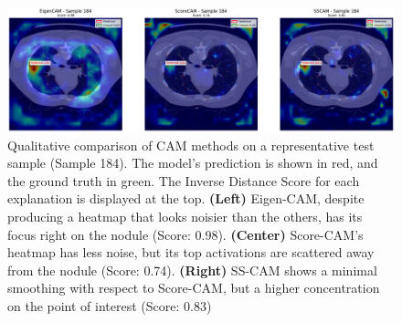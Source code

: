 \begin{figure}[h]
    \centering
    \includegraphics[width=1\linewidth]{images/xai-sample-184.png}
    \caption{Qualitative comparison of CAM methods on a representative test sample (Sample 184). The model's prediction is shown in red, and the ground truth in green. The Inverse Distance Score for each explanation is displayed at the top. \textbf{(Left)} Eigen-CAM, despite producing a heatmap that looks noisier than the others, has its focus right on the nodule (Score: 0.98). \textbf{(Center)} Score-CAM's heatmap has less noise, but its top activations are scattered away from the nodule (Score: 0.74). \textbf{(Right)} SS-CAM shows a minimal smoothing with respect to Score-CAM, but a higher concentration on the point of interest (Score: 0.83)}
    \label{fig:xai-qualitative-example}
\end{figure}